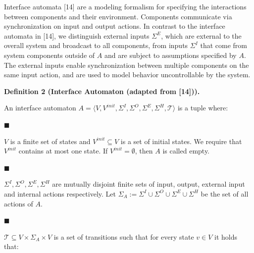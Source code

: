  
Interface automata [14] are a modeling formalism for specifying the interactions between components and their environment. Components communicate via synchronization on input and output actions. In contrast to the interface automata in [14], we distinguish external inputs $\Sigma^{E}$, which are external to the overall system and broadcast to all components, from inputs $\Sigma^{I}$ that come from system components outside of $A$ and are subject to assumptions specified by $A$. The external inputs enable synchronization between multiple components on the same input action, and are used to model behavior uncontrollable by the system.\par
 
 
 
\par\medskip\noindent\textbf{Definition 2 (Interface Automaton (adapted from [14])).}\par
 
 
An interface automaton $A=\langle V,V^{init},\Sigma^{I},\Sigma^{O},\Sigma^{E},\Sigma^{H},\mathcal{T}\rangle$ is a tuple where:\par
  
\par\noindent  $\blacksquare$ 
 
$V$ is a finite set of states and $V^{init}\subseteq V$ is a set of initial states. We require that $V^{init}$ contains at most one state. If $V^{init}=\emptyset$, then $A$ is called empty.\par
 
 
 
\par\noindent  $\blacksquare$ 
 
$\Sigma^{I},\Sigma^{O},\Sigma^{E},\Sigma^{H}$ are mutually disjoint finite sets of input, output, external input and internal actions respectively. Let $\Sigma_{A}:=\Sigma^{I}\cup\Sigma^{O}\cup\Sigma^{E}\cup\Sigma^{H}$ be the set of all actions of $A$.\par
 
 
 
\par\noindent  $\blacksquare$ 
 
$\mathcal{T}\subseteq V\times\Sigma_{A}\times V$ is a set of transitions such that for every state $v\in V$ it holds that:\par
  

